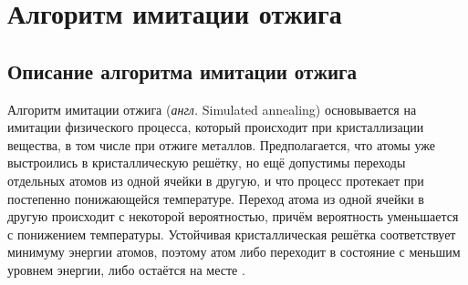 \documentclass[12pt, a4paper]{article}
\begin{document}

\section{Алгоритм имитации отжига} 
\subsection{Описание алгоритма имитации отжига}

Алгоритм имитации отжига (\textit{англ.} Simulated annealing) основывается на имитации физического процесса, который происходит при кристаллизации вещества, в том числе при отжиге металлов. Предполагается, что атомы уже выстроились в кристаллическую решётку, но ещё допустимы переходы отдельных атомов из одной ячейки в другую, и что процесс протекает при постепенно понижающейся температуре. Переход атома из одной ячейки в другую происходит с некоторой вероятностью, причём вероятность уменьшается с понижением температуры. Устойчивая кристаллическая решётка соответствует минимуму энергии атомов, поэтому атом либо переходит в состояние с меньшим уровнем энергии, либо остаётся на месте \cite{habr}. 
\end{document}
